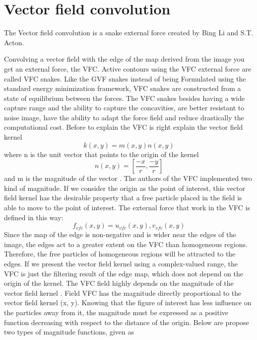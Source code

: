 \chapter{Vector field convolution}
The Vector field convolution is a snake external force created by Bing Li and S.T. Acton.

\bigskip

Convolving a vector field with the edge of the map derived from the image you get an external force, the VFC. Active contours using the VFC external force are called VFC snakes. Like the GVF snakes instead of being Formulated using the standard energy minimization framework, VFC snakes are constructed from a state of equilibrium between the forces. The VFC snakes besides having a wide capture range and the ability to capture the concavities, are better resistant to noise image, have the ability to adapt the force field and reduce drastically the computational cost.
Before to explain the VFC is right explain the vector field kernel
\begin{equation}
 k ( x,y ) =m(x,y)n(x,y)
\end{equation}
where n is the unit vector that points to the origin of the kernel	
\begin{equation}
n ( x,y ) = [\frac{-x}{r} , \frac{-y}{r} ]
\end{equation}
and m is the magnitude of the vector . The authors of the VFC implemented two kind of magnitude. If we consider the origin as the point of interest, this vector field kernel has the desirable property that a free particle placed in the field is able to move to the point of interest. The external force that work in the VFC is defined in this way:
\begin{equation}
{f} _{vfc} ( x,y ) = {u} _{vfc} ( x,y ) , {v} _{vfc} (x,y)
\end{equation}
Since the map of the edge is non-negative and is wider near the edges of the image, the edges act to a greater extent on the VFC than homogeneous regions. Therefore, the free particles of homogeneous regions will be attracted to the edges. If we present the vector field kernel using a complex-valued range, the VFC is just the filtering result of the edge map, which does not depend on the origin of the kernel. The VFC field highly depends on the magnitude of the vector field kernel . Field VFC has the magnitude directly proportional to the vector field kernel (x, y). Knowing that the figure of interest has less influence on the particles away from it, the magnitude must be expressed as a positive function decreasing with respect to the distance of the origin. Below are propose two types of magnitude functions, given as
